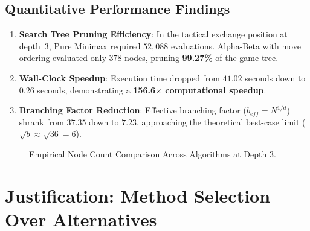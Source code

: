\documentclass[11pt,a4paper]{article}
\begin{document}
\subsection{Quantitative Performance Findings}
\begin{enumerate}[leftmargin=*]
    \item \textbf{Search Tree Pruning Efficiency}: In the tactical exchange position at depth~3, Pure Minimax required $52,088$ evaluations. Alpha-Beta with move ordering evaluated only $378$ nodes, pruning \textbf{99.27\%} of the game tree.
    \item \textbf{Wall-Clock Speedup}: Execution time dropped from $41.02$ seconds down to $0.26$ seconds, demonstrating a \textbf{156.6$\times$ computational speedup}.
    \item \textbf{Branching Factor Reduction}: Effective branching factor ($b_{eff} = N^{1/d}$) shrank from $37.35$ down to $7.23$, approaching the theoretical best-case limit ($\sqrt{b} \approx \sqrt{36} = 6$).
\end{enumerate}

\begin{figure}[H]
\centering
{}
\caption{Empirical Node Count Comparison Across Algorithms at Depth 3.}
\label{fig:nodes_chart}
\end{figure}

\section{Justification: Method Selection Over Alternatives}
\end{document}
